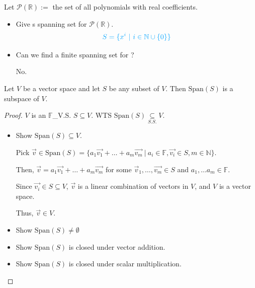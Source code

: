 \documentclass[11pt,fleqn]{book} %
\begin{document}
\begin{example}
    Let $\mathcal{P}(\mathbb{R}):=$ the set of all polynomials with real coefficients. 

    \begin{itemize}
        \item Give s spanning set for $\mathcal{P}(\mathbb{R})$. 
        $$\color{lightblue} S = \{ x^i ~|~ i \in \mathbb{N} \cup \{0\} \} $$
        
        \vspace{-0.5cm}
        \item Can we find a finite spanning set for ? 

        {\color{lightblue} No. }
    \end{itemize}
\end{example}

\setcounter{dummy}{3}
\begin{theorem}
    Let $V$ be a vector space and let $S$ be any subset of $V$. Then $\mathrm{Span}(S)$ is a subspace of $V$.
\end{theorem}

\begin{proof}
    $V$ is an $\mathbb{F}$\_V.S. $S \subseteq V$. WTS $\mathrm{Span}(S) \underset{S.S.}{\subseteq} V$. 
    
    \begin{itemize}
        \item Show $\mathrm{Span}(S) \subseteq V$. 
        
        Pick $\overrightarrow{v} \in \mathrm{Span}\left( S \right) = \{ a_1\overrightarrow{v_1} + \dots + a_m\overrightarrow{v_m} ~|~ a_i \in \mathbb{F}, \overrightarrow{v_i} \in S, m \in \mathbb{N} \}$. 
        
        Then, $\overrightarrow{v} = a_1\overrightarrow{v_1} + \dots + a_m\overrightarrow{v_m}$ for some $\overrightarrow{v}_1, \dots, \overrightarrow{v_m} \in S$ and $a_1,\dots a_m  \in \mathbb{F}$. 
        
        Since $\overrightarrow{v_i} \in S \subseteq V$, $\overrightarrow{v}$ is a linear combination of vectors in $V$, and $V$ is a vector space. 
        
        Thus, $\overrightarrow{v} \in V$. 
        
        \item Show $\mathrm{Span}(S) \neq \emptyset$

        \item Show $\mathrm{Span}(S)$ is closed under vector addition. 

        \item Show $\mathrm{Span}(S)$ is closed under scalar multiplication. 
    \end{itemize}
\end{proof}
\end{document}
